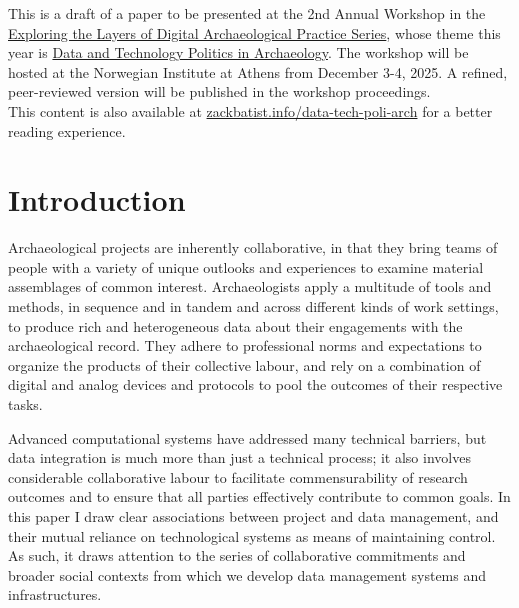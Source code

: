 \documentclass[
  canadian,
]{article}
\begin{document}
\begin{tcolorbox}[enhanced jigsaw, toprule=.15mm, rightrule=.15mm, toptitle=1mm, opacityback=0, leftrule=.75mm, title=\textcolor{quarto-callout-note-color}{\faInfo}\hspace{0.5em}{Note}, colbacktitle=quarto-callout-note-color!10!white, breakable, titlerule=0mm, bottomtitle=1mm, bottomrule=.15mm, arc=.35mm, left=2mm, colback=white, opacitybacktitle=0.6, colframe=quarto-callout-note-color-frame, coltitle=black]

This is a draft of a paper to be presented at the 2nd Annual Workshop in
the
\href{https://www.uib.no/en/nia/177998/digital-archaeology-workshop-series-2024\%E2\%80\%932027}{Exploring
the Layers of Digital Archaeological Practice Series}, whose theme this
year is
\href{https://www.uib.no/en/nia/179128/data-and-technology-politics-archaeology}{Data
and Technology Politics in Archaeology}. The workshop will be hosted at
the Norwegian Institute at Athens from December 3-4, 2025. A refined,
peer-reviewed version will be published in the workshop proceedings.\\

{This content is also available at
\href{https://zackbatist.info/data-tech-poli-arch/}{zackbatist.info/data-tech-poli-arch}
for a better reading experience.}

\end{tcolorbox}

\section{Introduction}\label{introduction}

Archaeological projects are inherently collaborative, in that they bring
teams of people with a variety of unique outlooks and experiences to
examine material assemblages of common interest. Archaeologists apply a
multitude of tools and methods, in sequence and in tandem and across
different kinds of work settings, to produce rich and heterogeneous data
about their engagements with the archaeological record. They adhere to
professional norms and expectations to organize the products of their
collective labour, and rely on a combination of digital and analog
devices and protocols to pool the outcomes of their respective tasks.

Advanced computational systems have addressed many technical barriers,
but data integration is much more than just a technical process; it also
involves considerable collaborative labour to facilitate
commensurability of research outcomes and to ensure that all parties
effectively contribute to common goals. In this paper I draw clear
associations between project and data management, and their mutual
reliance on technological systems as means of maintaining control. As
such, it draws attention to the series of collaborative commitments and
broader social contexts from which we develop data management systems
and infrastructures.
\end{document}
